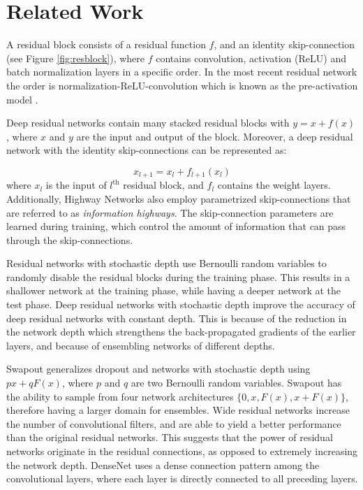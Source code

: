 \documentclass[journal]{IEEEtran}
\begin{document}
\section{Related Work}\label{sec2}

A residual block consists of a residual function $f$, and an identity skip-connection (see Figure \ref{fig:resblock}), where $f$ contains convolution, activation (ReLU) and batch normalization  \cite{ioffe2015batch} layers in a specific order. In the most recent residual network the order is normalization-ReLU-convolution which is known as the pre-activation model \cite{he2016identity}.


Deep residual networks contain many stacked residual blocks with $y = x + f(x)$, where $x$ and $y$ are the input and output of the block. Moreover, a deep residual network with the identity skip-connections \cite{he2016identity} can be represented as:

\begin{equation}\label{iresnet}
x_{l+1} = x_l+f_{l+1}(x_l)
\end{equation}
where $x_l$ is the input of $l^{\text{th}}$ residual block, and $f_l$ contains the weight layers. Additionally, Highway Networks \cite{srivastava2015training,srivastava2015highway} also employ parametrized skip-connections that are referred to as \textit{information highways}. The skip-connection parameters are learned during training, which control the amount of information that can pass through the skip-connections.




Residual networks with stochastic depth \cite{huang2016deep} use Bernoulli random variables to randomly disable the residual blocks during the training phase. This results in a shallower network at the training phase, while having a deeper network at the test phase. Deep residual networks with stochastic depth improve the accuracy of deep residual networks with constant depth. This is because of the reduction in the network depth which strengthens the back-propagated gradients of the earlier layers, and because of ensembling networks of different depths.

Swapout \cite{singh2016swapout} generalizes dropout \cite{srivastava2014dropout} and networks with stochastic depth \cite{huang2016deep} using $px+ qF(x)$, where $p$ and $q$ are two Bernoulli random variables. Swapout has the ability to sample from four network architectures $\{0, x, F(x), x+F(x)\}$, therefore having a larger domain for ensembles. Wide residual networks \cite{zagoruyko2016wide} increase the number of convolutional filters, and are able to yield a better performance than the original residual networks. This suggests that the power of residual networks originate in the residual connections, as opposed to extremely increasing the network depth. DenseNet \cite{huang2016densely} uses a dense connection pattern among the convolutional layers, where each layer is directly connected to all preceding layers.
\end{document}
